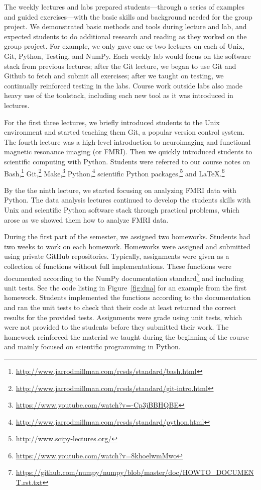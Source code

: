 The weekly lectures and labs prepared students---through a
series of examples and guided exercises---with the basic skills and
background needed for the group project.
We demonstrated basic methods and tools during lecture and lab,
and expected students to do additional research and reading as they worked on
the group project.
For example, we only gave one or two lectures on each of Unix, Git, Python,
Testing, and NumPy.
Each weekly lab would focus on the software stack from previous lectures;
after the Git lecture, we began to use Git and Github to fetch and submit all
exercises;
after we taught on testing, we continually reinforced testing in the labs.
Course work outside labs also made heavy use of the toolstack, including each
new tool as it was introduced in lectures.

For the first three lectures, we briefly introduced students to the Unix
environment and started teaching them Git, a popular version control system.
The fourth lecture was a high-level introduction to neuroimaging and
functional magnetic resonance imaging (or FMRI).
Then we quickly introduced students to scientific computing with Python.
Students were referred to our course notes on
Bash,\footnote{\url{http://www.jarrodmillman.com/rcsds/standard/bash.html}}
Git,\footnote{\url{http://www.jarrodmillman.com/rcsds/standard/git-intro.html}}
Make,\footnote{\url{https://www.youtube.com/watch?v=-Cp3jBBHQBE}}
Python,\footnote{\url{http://www.jarrodmillman.com/rcsds/standard/python.html}}
scientific Python packages,\footnote{\url{http://www.scipy-lectures.org/}}
and \LaTeX.\footnote{\url{https://www.youtube.com/watch?v=8khoelwmMwo}}

By the the ninth lecture, we started focusing on analyzing FMRI data
with Python.
The data analysis lectures continued to develop the students skills with
Unix and scientific Python software stack through practical problems,
which arose as we showed them how to analyze FMRI data.

During the first part of the semester, we assigned two homeworks.
Students had two weeks to work on each homework.
Homeworks were assigned and submitted using private GitHub repositories.
Typically, assignments were given as a collection of functions without full
implementations.
These functions were documented according to the NumPy documentation
standard\footnote{\url{https://github.com/numpy/numpy/blob/master/doc/HOWTO_DOCUMENT.rst.txt}}
and including unit tests.
See the code listing in Figure~\ref{fig:dna} for an example from the first homework.
Students implemented the functions according to the documentation
and ran the unit tests to check that their code at least
returned the correct results for the provided tests.
Assignments were grade using unit tests, which were not provided to
the students before they submitted their work.
The homework reinforced the material we taught during the
beginning of the course and mainly focused on scientific programming
in Python.

